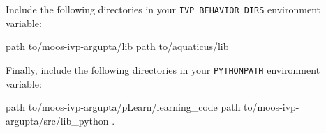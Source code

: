 \documentclass[onecolumn,letterpaper,11pt]{article}
\begin{document}
Include the following directories in your \texttt{IVP\_BEHAVIOR\_DIRS} environment variable: 

\vspace{0.15in}
\begin{fileverb}
{path to}/moos-ivp-argupta/lib
{path to}/aquaticus/lib
\end{fileverb}
\vspace{0.15in}

Finally, include the following directories in your \texttt{PYTHONPATH} environment variable: 

\vspace{0.15in}
\begin{fileverb}
{path to}/moos-ivp-argupta/pLearn/learning_code
{path to}/moos-ivp-argupta/src/lib_python
.
\end{fileverb}
\vspace{0.15in}

\end{document}
